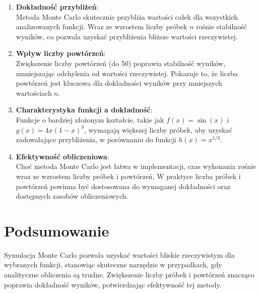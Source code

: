 \documentclass{article}
\begin{document}
\begin{enumerate}
    \item \textbf{Dokładność przybliżeń}: \\
    Metoda Monte Carlo skutecznie przybliża wartości całek dla wszystkich analizowanych funkcji. Wraz ze wzrostem liczby próbek \( n \) rośnie stabilność wyników, co pozwala uzyskać przybliżenia bliższe wartości rzeczywistej.
    
    \item \textbf{Wpływ liczby powtórzeń}: \\
    Zwiększenie liczby powtórzeń (do 50) poprawia stabilność wyników, zmniejszając odchylenia od wartości rzeczywistej. Pokazuje to, że liczba powtórzeń jest kluczowa dla dokładności wyników przy mniejszych wartościach \( n \).
    
    \item \textbf{Charakterystyka funkcji a dokładność}: \\
    Funkcje o bardziej złożonym kształcie, takie jak \( f(x) = \sin(x) \) i \( g(x) = 4x(1 - x)^3 \), wymagają większej liczby próbek, aby uzyskać zadowalające przybliżenia, w porównaniu do funkcji \( h(x) = x^{1/3} \).
    
    \item \textbf{Efektywność obliczeniowa}: \\
    Choć metoda Monte Carlo jest łatwa w implementacji, czas wykonania rośnie wraz ze wzrostem liczby próbek i powtórzeń. W praktyce liczba próbek i powtórzeń powinna być dostosowana do wymaganej dokładności oraz dostępnych zasobów obliczeniowych.
\end{enumerate}

\section*{Podsumowanie}

Symulacja Monte Carlo pozwala uzyskać wartości bliskie rzeczywistym dla wybranych funkcji, stanowiąc skuteczne narzędzie w przypadkach, gdy analityczne obliczenia są trudne. Zwiększenie liczby próbek i powtórzeń znacząco poprawia dokładność wyników, potwierdzając efektywność tej metody.
\end{document}
